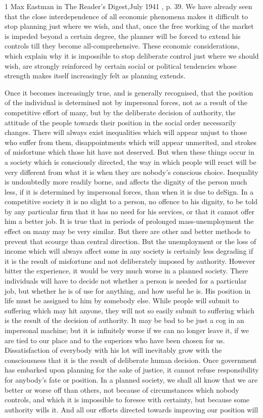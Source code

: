 \documentclass[11pt,openany]{book}
\begin{document}
1 Max Eastman in The Reader's Digest,July 1941 , p. 39. We have already seen that the close interdependence of all economic phenomena makes it difficult to stop planning just where we wish, and that, once the free working of the market is impeded beyond a certain degree, the planner will be forced to extend his controls till they become all-comprehensive. These economic considerations, which explain why it is impossible to stop deliberate control just where we should wish, are strongly reinforced by certain social or political tendencies whose strength makes itself increasingly felt as planning extends.

Once it becomes increasingly true, and is generally recognised, that the position of the individual is determined not by impersonal forces, not as a result of the competitive effort of many, but by the deliberate decision of authority, the attitude of the people towards their position in the social order necessarily changes. There will always exist inequalities which will appear unjust to those who suffer from them, disappointments which will appear unmerited, and strokes of misfortune which those hit have not deserved. But when these things occur in a society which is consciously directed, the way in which people will react will be very different from what it is when they are nobody's conscious choice. Inequality is undoubtedly more readily borne, and affects the dignity of the person much less, if it is determined by impersonal forces, than when it is due to deSign. In a competitive society it is no slight to a person, no offence to his dignity, to be told by any particular firm that it has no need for his services, or that it cannot offer him a better job. It is true that in periods of prolonged mass-unemployment the effect on many may be very similar. But there are other and better methods to prevent that scourge than central direction. But the unemployment or the loss of income which will always affect some in any society is certainly less degrading if it is the result of misfortune and not deliberately imposed by authority. However bitter the experience, it would be very much worse in a planned society. There individuals will have to decide not whether a person is needed for a particular job, but whether he is of use for anything, and how useful he is. His position in life must be assigned to him by somebody else. While people will submit to suffering which may hit anyone, they will not so easily submit to suffering which is the result of the decision of authority. It may be bad to be just a cog in an impersonal machine; but it is infinitely worse if we can no longer leave it, if we are tied to our place and to the superiors who have been chosen for us. Dissatisfaction of everybody with his lot will inevitably grow with the consciousness that it is the result of deliberate human decision. Once government has embarked upon planning for the sake of justice, it cannot refuse responsibility for anybody's fate or position. In a planned society, we shall all know that we are better or worse off than others, not because of circumstances which nobody controls, and which it is impossible to foresee with certainty, but because some authority wills it. And all our efforts directed towards improving our position will 
\end{document}
